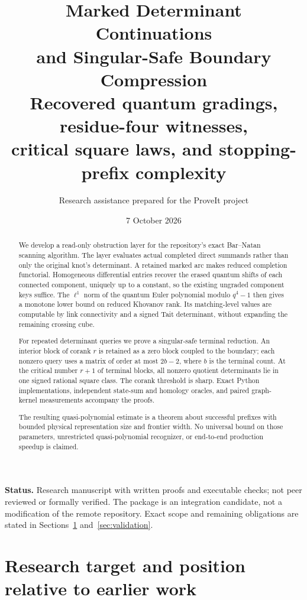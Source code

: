 \documentclass[11pt]{article}
\title{\color{inkblue}\bfseries Marked Determinant Continuations\\[4pt]
\Large and Singular-Safe Boundary Compression\\[7pt]
\large Recovered quantum gradings, residue-four witnesses,\\
critical square laws, and stopping-prefix complexity}
\author{Research assistance prepared for the ProveIt project}
\date{7 October 2026}
\theoremstyle{definition}
\theoremstyle{remark}
\begin{document}
\maketitle
\thispagestyle{empty}
\begin{abstract}
We develop a read-only obstruction layer for the repository's exact
Bar--Natan scanning algorithm. The layer evaluates actual completed direct
summands rather than only the original knot's determinant. A retained marked
arc makes reduced completion functorial. Homogeneous differential entries
recover the erased quantum shifts of each connected component, uniquely up
to a constant, so the existing ungraded component keys suffice. The
$\ell^1$ norm of the quantum Euler polynomial modulo $q^4-1$ then gives a
monotone lower bound on reduced Khovanov rank. Its matching-level values are
computable by link connectivity and a signed Tait determinant, without
expanding the remaining crossing cube.

For repeated determinant queries we prove a singular-safe terminal reduction.
An interior block of corank $r$ is retained as a zero block coupled to the
boundary; each nonzero query uses a matrix of order at most $2b-2$, where
$b$ is the terminal count. At the critical number $r+1$ of terminal blocks,
all nonzero quotient determinants lie in one signed rational square class.
The corank threshold is sharp. Exact Python implementations, independent
state-sum and homology oracles, and paired graph-kernel measurements accompany
the proofs.

The resulting quasi-polynomial estimate is a theorem about successful
prefixes with bounded physical representation size and frontier width.
No universal bound on those parameters, unrestricted quasi-polynomial
recognizer, or end-to-end production speedup is claimed.
\end{abstract}
\vfill
{\small\textbf{Status.} Research manuscript with written proofs and executable
checks; not peer reviewed or formally verified. The package is an integration
candidate, not a modification of the remote repository. Exact scope and
remaining obligations are stated in Sections~\ref{sec:scope} and~\ref{sec:validation}.}
\clearpage
\tableofcontents
\clearpage

\section{Research target and position relative to earlier work}
\label{sec:scope}
\end{document}
